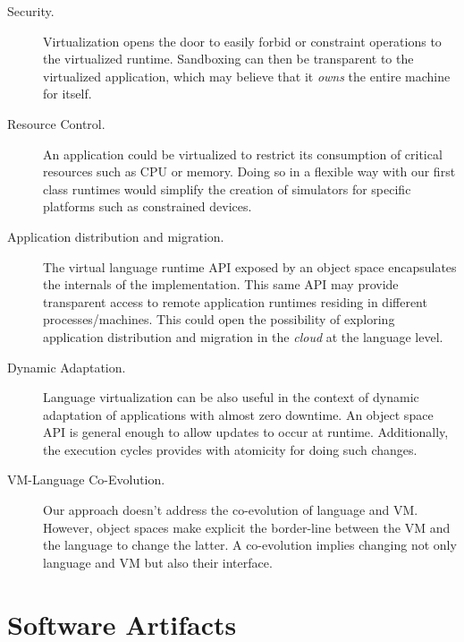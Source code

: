 \begin{description}

\item[Security.] Virtualization opens the door to easily forbid or constraint operations to the virtualized runtime. Sandboxing can then be transparent to the virtualized application, which may believe that it \emph{owns} the entire machine for itself.

\item[Resource Control.] An application could be virtualized to restrict its consumption of critical resources such as CPU or memory. Doing so in a flexible way with our first class runtimes would simplify \eg the creation of simulators for specific platforms such as constrained devices.

\item[Application distribution and migration.] The virtual language runtime API exposed by an object space encapsulates the internals of the implementation. This same API may provide transparent access to remote application runtimes residing in different processes/machines. This could open the possibility of exploring application distribution and migration in the \emph{cloud} at the language level.

\item[Dynamic Adaptation.] Language virtualization can be also useful in the context of dynamic adaptation of applications with almost zero downtime. An object space API is general enough to allow updates to occur at runtime. Additionally, the execution cycles provides with atomicity for doing such changes.

\item[VM-Language Co-Evolution.] Our approach doesn't address the co-evolution of language and VM. However, object spaces make explicit the border-line between the VM and the language to change the latter. A co-evolution implies changing not only language and VM but also their interface.

\end{description}

\section{Software Artifacts}


